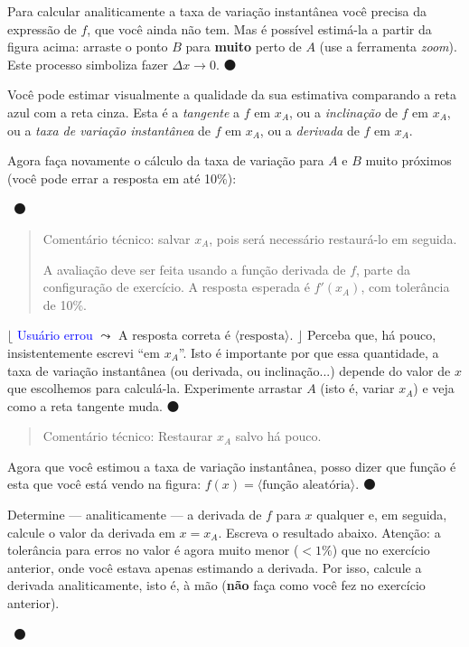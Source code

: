\documentclass[fleqn,12pt]{scrartcl}
\newenvironment{ct}{\begin{quotation}\color{red!30!black}\sffamily\small Comentário técnico:}{\end{quotation}} %
\newcommand\foreign[1]{\textsl{#1}}
\newcommand\proceed{\textcolor{green!50!black}{$\medbullet$}\xspace}
\newcommand\condicional[2]{$\lfloor$%
	\textsf{\textcolor{blue}{{\footnotesize #1}}}
	$\leadsto$ #2%
	$\rfloor$}
\newcommand\parametro[1]{\ensuremath{\langle\text{#1}\rangle}}
\newcommand\answerfield{\framebox[3cm]{\phantom{A}}~\proceed}
\begin{document}
    Para calcular analiticamente a taxa de variação instantânea você precisa da expressão de $f$, que você ainda não tem. Mas é possível estimá-la a partir da figura acima: arraste o ponto $B$ para \textbf{muito} perto de $A$ (use a ferramenta \foreign{zoom}). Este processo simboliza fazer $\Delta x \to 0$. \proceed

    Você pode estimar visualmente a qualidade da sua estimativa comparando a reta azul com a reta cinza. Esta é a \emph{tangente} a $f$ em $x_A$, ou a \emph{inclinação} de $f$ em $x_A$, ou a \emph{taxa de variação instantânea} de $f$ em $x_A$, ou a \emph{derivada} de $f$ em $x_A$.

    Agora faça novamente o cálculo da taxa de variação para $A$ e $B$ muito próximos (você pode errar a resposta em até 10\%):

    \answerfield

    \begin{ct}
	salvar $x_A$, pois será necessário restaurá-lo em seguida.

	A avaliação deve ser feita usando a função derivada de $f$, parte da configuração de exercício. A resposta esperada é $f'(x_A)$, com tolerância de 10\%.
    \end{ct}

    \condicional{Usuário errou}{A resposta correta é \parametro{resposta}.} Perceba que, há pouco, insistentemente escrevi ``em $x_A$''. Isto é importante por que essa quantidade, a taxa de variação instantânea (ou derivada, ou inclinação...) depende do valor de $x$ que escolhemos para calculá-la. Experimente arrastar $A$ (isto é, variar $x_A$) e veja como a reta tangente muda. \proceed

    \begin{ct}
	Restaurar $x_A$ salvo há pouco.
    \end{ct}

    Agora que você estimou a taxa de variação instantânea, posso dizer que função é esta que você está vendo na figura: $f(x) = \parametro{função aleatória}$. \proceed

    Determine --- analiticamente --- a derivada de $f$ para $x$ qualquer e, em seguida, calcule o valor da derivada em $x = x_A$. Escreva o resultado abaixo. Atenção: a tolerância para erros no valor é agora muito menor ($< 1\%$) que no exercício anterior, onde você estava apenas estimando a derivada. Por isso, calcule a derivada analiticamente, isto é, à mão (\textbf{não} faça como você fez no exercício anterior).

    \answerfield
\end{document}

